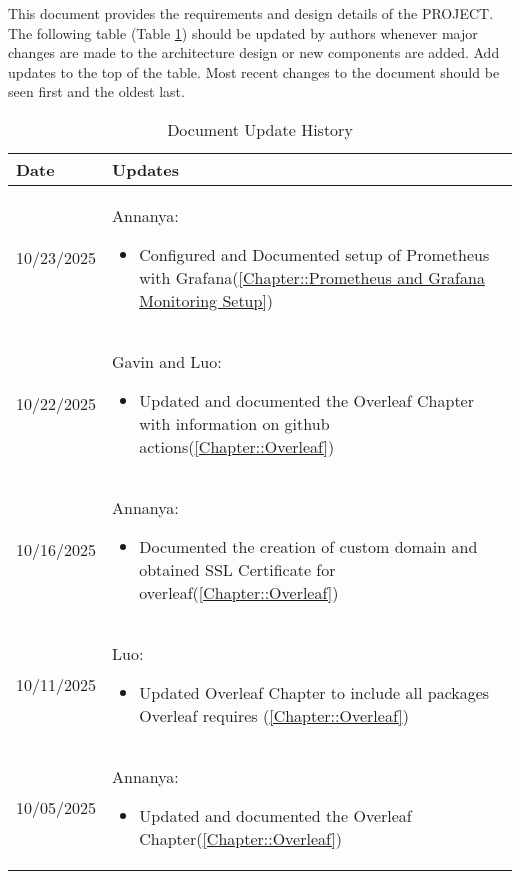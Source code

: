 This document provides the requirements and design details of the
PROJECT.  The following table (Table \ref{Table::UpdateHistory}) should be
updated by authors whenever major changes are made to the architecture
design or new components are added. Add updates to the top of the table.  
Most recent changes to the document should be seen first and the oldest 
last.

\begin{longtable}{|l||p{13.5cm}|}
\caption{Document Update History \label{Table::UpdateHistory}}\\
\hline
\textbf{Date} & \textbf{Updates} \\
\hline 
\endhead

10/23/2025 & Annanya:
\begin{itemize}[topsep=0pt,itemsep=0pt,parsep=0pt,partopsep=0pt,leftmargin=12pt]
\item Configured and Documented setup of Prometheus with Grafana(\ref{Chapter::Prometheus and Grafana Monitoring Setup})
\end{itemize} 
\\ \hline

10/22/2025 & Gavin and Luo:
\begin{itemize}[topsep=0pt,itemsep=0pt,parsep=0pt,partopsep=0pt,leftmargin=12pt]
\item Updated and documented the Overleaf Chapter with information on github actions(\ref{Chapter::Overleaf})
\end{itemize} 
\\ \hline

10/16/2025 & Annanya:
\begin{itemize}[topsep=0pt,itemsep=0pt,parsep=0pt,partopsep=0pt,leftmargin=12pt]
\item Documented the creation of custom domain and obtained SSL Certificate for overleaf(\ref{Chapter::Overleaf})
\end{itemize} 
\\ \hline

10/11/2025 & Luo:
\begin{itemize}[topsep=0pt,itemsep=0pt,parsep=0pt,partopsep=0pt,leftmargin=12pt]
\item Updated Overleaf Chapter to include all packages Overleaf requires (\ref{Chapter::Overleaf})
\end{itemize} 
\\ \hline

10/05/2025 & Annanya:
\begin{itemize}[topsep=0pt,itemsep=0pt,parsep=0pt,partopsep=0pt,leftmargin=12pt]
\item Updated and documented the Overleaf Chapter(\ref{Chapter::Overleaf})
\end{itemize} 
\\ \hline


\end{longtable}
